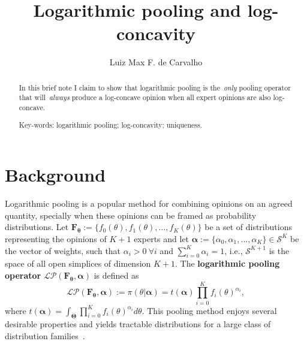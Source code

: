 \documentclass[a4paper, notitlepage, 10pt]{article}
\title{\vspace{-9ex}\centering \bf Logarithmic pooling and log-concavity}
\author{
Luiz Max F. de Carvalho\\
}
\begin{document}
\maketitle

\begin{abstract}
In this brief note I claim to show that logarithmic pooling is the~\textit{only} pooling operator that will~\textit{always} produce a log-concave opinion when all expert opinions are also log-concave.

Key-words: logarithmic pooling; log-concavity; uniqueness. 
\end{abstract}

\section*{Background}

Logarithmic pooling is a popular method for combining opinions on an agreed quantity, specially when these opinions can be framed as probability distributions.
Let $\mathbf{F_\theta} := \{f_0(\theta), f_1(\theta), \ldots, f_K(\theta)\}$ be a set of distributions representing the opinions of $K + 1$ experts and let $\boldsymbol\alpha :=\{\alpha_0, \alpha_1, \ldots, \alpha_K \} \in \mathcal{S}^K$ be the vector of weights, such that $\alpha_i > 0\: \forall i$ and $\sum_{i=0}^K \alpha_i = 1$, i.e., $\mathcal{S}^{K + 1}$ is the space of all open simplices of dimension $K + 1$.
The \textbf{logarithmic pooling operator} $\mathcal{LP}(\mathbf{F_\theta}, \boldsymbol\alpha)$ is defined as
\begin{equation}
\label{eq:logpool}
 \mathcal{LP}(\mathbf{F_\theta}, \boldsymbol\alpha) :=  \pi(\theta | \boldsymbol\alpha) = t(\boldsymbol\alpha) \prod_{i=0}^K f_i(\theta)^{\alpha_i},
\end{equation}
where $t(\boldsymbol\alpha) = \int_{\boldsymbol\Theta}\prod_{i=0}^K f_i(\theta)^{\alpha_i}d\theta$.
This pooling method enjoys several desirable properties and yields tractable distributions for a large class of distribution families~\citep{genest1984,genest1986A}.
\end{document}
